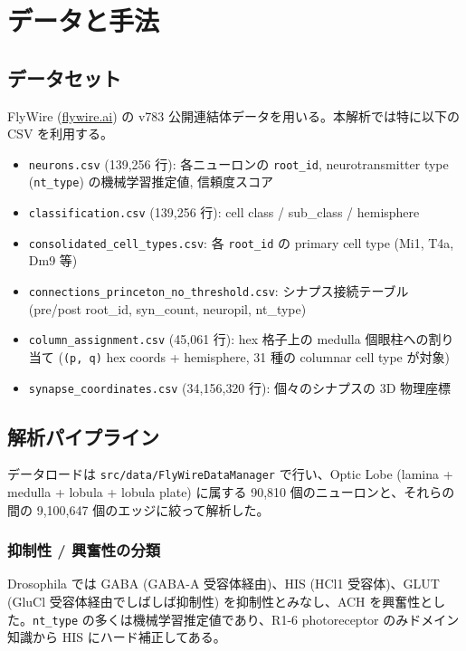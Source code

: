 \documentclass[11pt,a4paper]{ltjsarticle}
\begin{document}
\section{データと手法}\label{sec:methods}

\subsection{データセット}

FlyWire (\href{https://flywire.ai}{flywire.ai}) の v783 公開連結体データを用いる。本解析では特に以下の CSV を利用する。
\begin{itemize}
\item \texttt{neurons.csv} (139{,}256 行): 各ニューロンの \texttt{root\_id}, neurotransmitter type (\texttt{nt\_type}) の機械学習推定値, 信頼度スコア
\item \texttt{classification.csv} (139{,}256 行): cell class / sub\_class / hemisphere
\item \texttt{consolidated\_cell\_types.csv}: 各 \texttt{root\_id} の primary cell type (Mi1, T4a, Dm9 等)
\item \texttt{connections\_princeton\_no\_threshold.csv}: シナプス接続テーブル (pre/post root\_id, syn\_count, neuropil, nt\_type)
\item \texttt{column\_assignment.csv} (45{,}061 行): hex 格子上の medulla 個眼柱への割り当て (\texttt{(p, q)} hex coords + hemisphere, 31 種の columnar cell type が対象)
\item \texttt{synapse\_coordinates.csv} (34{,}156{,}320 行): 個々のシナプスの 3D 物理座標
\end{itemize}

\subsection{解析パイプライン}

データロードは \texttt{src/data/FlyWireDataManager} で行い、Optic Lobe (lamina + medulla + lobula + lobula plate) に属する 90{,}810 個のニューロンと、それらの間の 9{,}100{,}647 個のエッジに絞って解析した。

\subsubsection*{抑制性 / 興奮性の分類}

Drosophila では GABA (GABA-A 受容体経由)、HIS (HCl1 受容体)、GLUT (GluCl 受容体経由でしばしば抑制性) を抑制性とみなし、ACH を興奮性とした。\texttt{nt\_type} の多くは機械学習推定値であり、R1-6 photoreceptor のみドメイン知識から HIS にハード補正してある。
\end{document}
